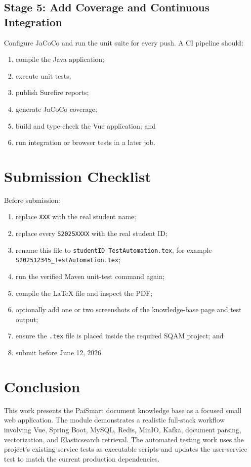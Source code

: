 \documentclass[11pt,a4paper]{article}
\begin{document}
\subsection{Stage 5: Add Coverage and Continuous Integration}

Configure JaCoCo and run the unit suite for every push. A CI pipeline should:
\begin{enumerate}[leftmargin=2em]
  \item compile the Java application;
  \item execute unit tests;
  \item publish Surefire reports;
  \item generate JaCoCo coverage;
  \item build and type-check the Vue application; and
  \item run integration or browser tests in a later job.
\end{enumerate}

\section{Submission Checklist}

Before submission:
\begin{enumerate}[leftmargin=2em]
  \item replace \texttt{XXX} with the real student name;
  \item replace every \texttt{S2025XXXX} with the real student ID;
  \item rename this file to \texttt{studentID\_TestAutomation.tex}, for example
        \texttt{S202512345\_TestAutomation.tex};
  \item run the verified Maven unit-test command again;
  \item compile the LaTeX file and inspect the PDF;
  \item optionally add one or two screenshots of the knowledge-base page and test output;
  \item ensure the \texttt{.tex} file is placed inside the required SQAM project; and
  \item submit before June 12, 2026.
\end{enumerate}

\section{Conclusion}

This work presents the PaiSmart document knowledge base as a focused small web
application. The module demonstrates a realistic full-stack workflow involving Vue,
Spring Boot, MySQL, Redis, MinIO, Kafka, document parsing, vectorization, and
Elasticsearch retrieval. The automated testing work uses the project's existing
service tests as executable scripts and updates the user-service test to match the
current production dependencies.
\end{document}
